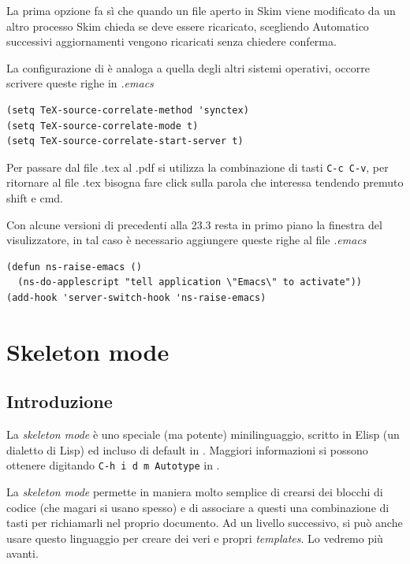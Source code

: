 \documentclass[11pt,a4paper]{article}
\begin{document}
La prima opzione fa sì che quando un file aperto in Skim viene
modificato da un altro processo Skim chieda se deve essere ricaricato,
scegliendo Automatico successivi aggiornamenti vengono ricaricati
senza chiedere conferma.

La configurazione di \emacs{} è analoga a quella degli altri sistemi
operativi, occorre scrivere queste righe in \emph{.emacs}
\begin{Verbatim}
(setq TeX-source-correlate-method 'synctex)
(setq TeX-source-correlate-mode t)
(setq TeX-source-correlate-start-server t)
\end{Verbatim}

Per passare dal file .tex al .pdf si utilizza la combinazione di tasti
\verb!C-c C-v!, per ritornare al file .tex bisogna fare click sulla
parola che interessa tendendo premuto shift e cmd.

Con alcune versioni di \emacs{} precedenti alla 23.3 resta in primo
piano la finestra del visulizzatore, in tal caso è necessario
aggiungere queste righe al file \emph{.emacs}
\begin{Verbatim}
(defun ns-raise-emacs ()
  (ns-do-applescript "tell application \"Emacs\" to activate"))
(add-hook 'server-switch-hook 'ns-raise-emacs)
\end{Verbatim}

\section{Skeleton mode}
\label{sec:skelmode}

\subsection{Introduzione}
\label{skelintro}

La \emph{skeleton mode} è uno speciale (ma potente) minilinguaggio, scritto in
Elisp (un dialetto di Lisp) ed incluso di default in \emacs. Maggiori
informazioni si possono ottenere digitando \verb!C-h i d m Autotype! in \emacs.

La \emph{skeleton mode} permette in maniera molto semplice di crearsi dei
blocchi di codice (che magari si usano spesso) e di associare a questi una
combinazione di tasti per richiamarli nel proprio documento. Ad un livello
successivo, si può anche usare questo linguaggio per creare dei veri e propri
\emph{templates}. Lo vedremo più avanti.
\end{document}
